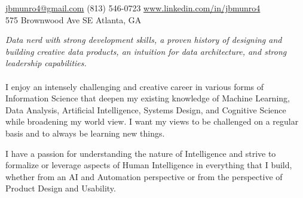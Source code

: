 \documentclass[10pt,a4paper]{article}
\begin{document}
\sloppy  %



\nobreakvspace{0.3em}  %

\noindent\href{mailto:jbmunro4.at.gmail.dot.com}{jbmunro4\mbox{}@\mbox{}gmail.com}\sbull
\textsmaller(813) 546-0723\sbull
\href{http://www.linkedin.com/in/jbmunro4}{www.linkedin.com/in/jbmunro4}
\\
575 Brownwood Ave SE\sbull
Atlanta, GA

\spacedhrule{0.9em}{-0.4em}  %


\vspace{-1.3em}  %
\begin{multicols}{2}  %
\noindent \emph{Data nerd with strong development skills, a proven history of designing and building creative data products, an intuition for data architecture, and strong leadership capabilities.}
\\
\\
I enjoy an intensely challenging and creative career in various forms of Information Science that deepen my existing knowledge of Machine Learning, Data Analysis, Artificial Intelligence, Systems Design, and Cognitive Science while broadening my world view. I want my views to be challenged on a regular basis and to always be learning new things.

I have a passion for understanding the nature of \mbox{Intelligence} and strive to formalize or leverage aspects of Human Intelligence in everything that I build, whether from an AI and Automation perspective or from the perspective of Product Design and Usability.
\end{multicols}


\spacedhrule{0em}{-0.4em}

\end{document}
